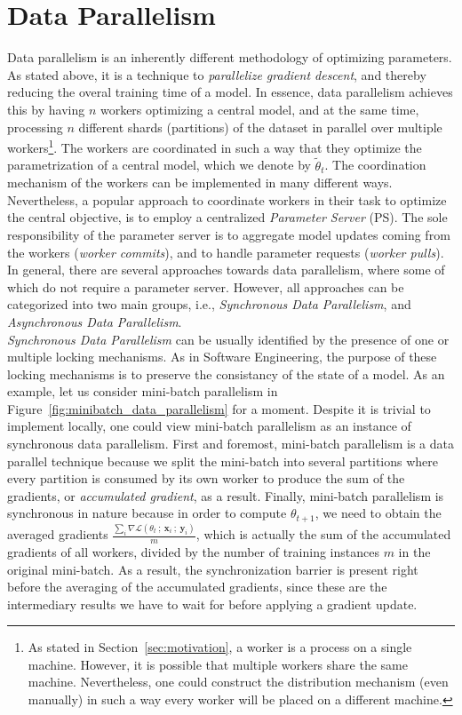 \section{Data Parallelism}
\label{sec:intro_data_parallelism}

Data parallelism is an inherently different methodology of optimizing parameters. As stated above, it is a technique to \emph{parallelize gradient descent}, and thereby reducing the overal training time of a model. In essence, data parallelism achieves this by having $n$ workers optimizing a central model, and at the same time, processing $n$ different shards (partitions) of the dataset in parallel over multiple workers\footnote{As stated in Section~\ref{sec:motivation}, a worker is a process on a single machine. However, it is possible that multiple workers share the same machine. Nevertheless, one could construct the distribution mechanism (even manually) in such a way every worker will be placed on a different machine.}. The workers are coordinated in such a way that they optimize the parametrization of a central model, which we denote by $\tilde{\theta}_t$. The coordination mechanism of the workers can be implemented in many different ways. Nevertheless, a popular approach to coordinate workers in their task to optimize the central objective, is to employ a centralized \emph{Parameter Server} (PS). The sole responsibility of the parameter server is to aggregate model updates coming from the workers (\emph{worker commits}), and to handle parameter requests (\emph{worker pulls}). In general, there are several approaches towards data parallelism, where some of which do not require a parameter server. However, all approaches can be categorized into two main groups, i.e., \emph{Synchronous Data Parallelism}, and \emph{Asynchronous Data Parallelism}.\\

\emph{Synchronous Data Parallelism} can be usually identified by the presence of one or multiple locking mechanisms. As in Software Engineering, the purpose of these locking mechanisms is to preserve the consistancy of the state of a model. As an example, let us consider mini-batch parallelism in Figure~\ref{fig:minibatch_data_parallelism} for a moment. Despite it is trivial to implement locally, one could view mini-batch parallelism as an instance of synchronous data parallelism. First and foremost, mini-batch parallelism is a data parallel technique because we split the mini-batch into several partitions where every partition is consumed by its own worker to produce the sum of the gradients, or \emph{accumulated gradient}, as a result. Finally, mini-batch parallelism is synchronous in nature because in order to compute $\theta_{t+1}$, we need to obtain the averaged gradients $\frac{\sum_i \nabla \mathcal{L}(\theta_t~;~\textbf{x}_i~;~\textbf{y}_i)}{m}$, which is actually the sum of the accumulated gradients of all workers, divided by the number of training instances $m$ in the original mini-batch. As a result, the synchronization barrier is present right before the averaging of the accumulated gradients, since these are the intermediary results we have to wait for before applying a gradient update.

